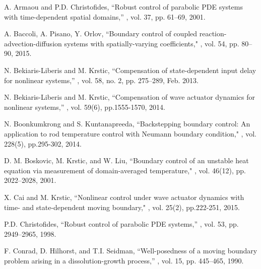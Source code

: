 \documentclass[journal]{IEEEtran}
\begin{document}
\begin{thebibliography}{99}

A. Armaou and P.D. Christofides,
\newblock ``Robust control of parabolic PDE systems with time-dependent spatial domains,''
, vol. 37, pp. 61--69,
  2001.
  
 A. Baccoli, A. Pisano, Y. Orlov,
    \newblock ``Boundary control of coupled reaction-advection-diffusion systems with spatially-varying coefficients,"
, vol. 54, pp. 80--90, 2015.
  
N. Bekiaris-Liberis and M. Krstic, 
\newblock ``Compensation of state-dependent input delay for nonlinear systems,''
, vol. 58, no. 2, pp. 275--289, 
Feb. 2013.

N. Bekiaris-Liberis and M. Krstic, 
\newblock ``Compensation of wave actuator dynamics for nonlinear systems,''
, vol. 59(6), pp.1555-1570, 2014.

N. Boonkumkrong and S. Kuntanapreeda, 
\newblock ``Backstepping boundary control: An application to rod temperature control with Neumann boundary condition,"
, vol. 228(5), pp.295-302, 2014.

D.  M. Boskovic, M. Krstic, and W. Liu,
\newblock ``Boundary control of an unstable heat equation via
measurement of domain-averaged temperature,"
, vol. 46(12), pp. 2022--2028, 2001.

X. Cai and M. Krstic, 
\newblock ``Nonlinear control under wave actuator dynamics with time- and state-dependent moving boundary,"
, vol. 25(2), pp.222-251, 2015.

P.D. Christofides,
\newblock ``Robust control of parabolic {PDE} systems,''
, vol. 53, pp. 2949--2965, 
1998.

F. Conrad, D. Hilhorst, and T.I. Seidman,
\newblock ``Well-posedness of a moving boundary problem arising in a
  dissolution-growth process,''
, vol. 15, pp. 445--465, 1990.


\end{thebibliography}
\end{document}
